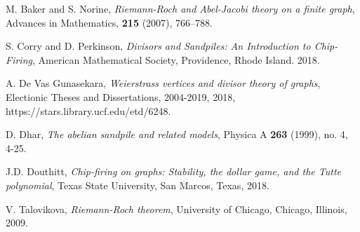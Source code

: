 \documentclass[openany, amssymb, psamsfonts]{amsart}
\theoremstyle{definition}
\numberwithin{equation}{section}
\begin{document}
\begin{thebibliography}{9}

M. Baker and S. Norine, \textit{Riemann-Roch and Abel-Jacobi theory on a finite graph}, Advances in Mathematics, \textbf{215} (2007), 766–788.

S. Corry and D. Perkinson, \textit{Divisors and Sandpiles: An Introduction to Chip-Firing}, American Mathematical Society, Providence, Rhode Island. 2018.

A. De Vas Gunasekara, \textit{Weierstrass vertices and divisor theory of graphs}, Electionic Theses and Dissertations, 2004-2019, 2018, https://stars.library.ucf.edu/etd/6248.

D. Dhar, \textit{The abelian sandpile and related models}, Physica A \textbf{263} (1999), no. 4, 4-25.

J.D. Douthitt, \textit{Chip-firing on graphs: Stability, the dollar game, and the Tutte polynomial}, Texas State University, San Marcos, Texas, 2018.

V. Talovikova, \textit{Riemann-Roch theorem}, University of Chicago, Chicago, Illinois, 2009.

\end{thebibliography}
\end{document}
